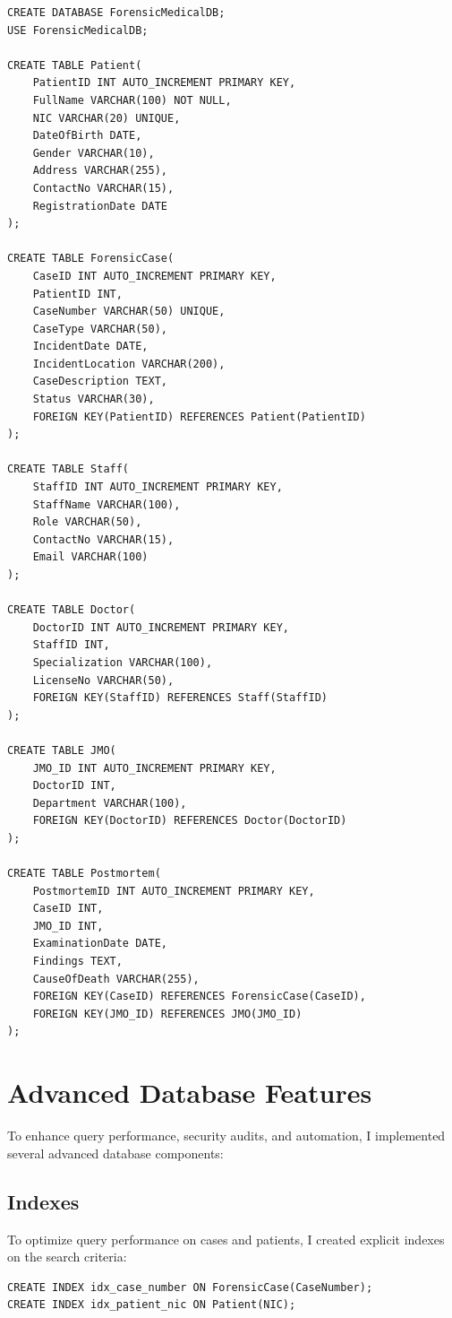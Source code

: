 \documentclass[12pt,a4paper]{article}
\begin{document}
\begin{lstlisting}[caption={Core Tables Implementation - Patient, ForensicCase, and Postmortem}]
CREATE DATABASE ForensicMedicalDB;
USE ForensicMedicalDB;

CREATE TABLE Patient(
    PatientID INT AUTO_INCREMENT PRIMARY KEY,
    FullName VARCHAR(100) NOT NULL,
    NIC VARCHAR(20) UNIQUE,
    DateOfBirth DATE,
    Gender VARCHAR(10),
    Address VARCHAR(255),
    ContactNo VARCHAR(15),
    RegistrationDate DATE
);

CREATE TABLE ForensicCase(
    CaseID INT AUTO_INCREMENT PRIMARY KEY,
    PatientID INT,
    CaseNumber VARCHAR(50) UNIQUE,
    CaseType VARCHAR(50),
    IncidentDate DATE,
    IncidentLocation VARCHAR(200),
    CaseDescription TEXT,
    Status VARCHAR(30),
    FOREIGN KEY(PatientID) REFERENCES Patient(PatientID)
);

CREATE TABLE Staff(
    StaffID INT AUTO_INCREMENT PRIMARY KEY,
    StaffName VARCHAR(100),
    Role VARCHAR(50),
    ContactNo VARCHAR(15),
    Email VARCHAR(100)
);

CREATE TABLE Doctor(
    DoctorID INT AUTO_INCREMENT PRIMARY KEY,
    StaffID INT,
    Specialization VARCHAR(100),
    LicenseNo VARCHAR(50),
    FOREIGN KEY(StaffID) REFERENCES Staff(StaffID)
);

CREATE TABLE JMO(
    JMO_ID INT AUTO_INCREMENT PRIMARY KEY,
    DoctorID INT,
    Department VARCHAR(100),
    FOREIGN KEY(DoctorID) REFERENCES Doctor(DoctorID)
);

CREATE TABLE Postmortem(
    PostmortemID INT AUTO_INCREMENT PRIMARY KEY,
    CaseID INT,
    JMO_ID INT,
    ExaminationDate DATE,
    Findings TEXT,
    CauseOfDeath VARCHAR(255),
    FOREIGN KEY(CaseID) REFERENCES ForensicCase(CaseID),
    FOREIGN KEY(JMO_ID) REFERENCES JMO(JMO_ID)
);
\end{lstlisting}

\section{Advanced Database Features}
To enhance query performance, security audits, and automation, I implemented several advanced database components:

\subsection{Indexes}
To optimize query performance on cases and patients, I created explicit indexes on the search criteria:
\begin{lstlisting}
CREATE INDEX idx_case_number ON ForensicCase(CaseNumber);
CREATE INDEX idx_patient_nic ON Patient(NIC);
\end{lstlisting}
\end{document}
